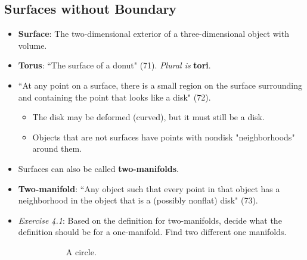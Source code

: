\documentclass[titlepage]{article}
\numberwithin{figure}{section}
\numberwithin{table}{section}
\numberwithin{equation}{section}
\newcommand{\dq}[2]{``#1" (#2).}
\begin{document}
\subsection{Surfaces without Boundary}
\begin{itemize}
    \item \textbf{Surface}: The two-dimensional exterior of a three-dimensional object with volume.
    \item \textbf{Torus}: \dq{The surface of a donut}{71} \emph{Plural is} \textbf{tori}.
    \item \dq{At any point on a surface, there is a small region on the surface surrounding and containing the point that looks like a disk}{72}
    \begin{itemize}
        \item The disk may be deformed (curved), but it must still be a disk.
        \item Objects that are not surfaces have points with nondisk "neighborhoods" around them.
    \end{itemize}
    \item Surfaces can also be called \textbf{two-manifolds}.
    \item \textbf{Two-manifold}: \dq{Any object such that every point in that object has a neighborhood in the object that is a (possibly nonflat) disk}{73}
    \item \emph{Exercise 4.1}: Based on the definition for two-manifolds, decide what the definition should be for a one-manifold. Find two different one manifolds.
    \begin{itemize}
        \begin{figure}[h!]
            \centering
            \begin{subfigure}[b]{0.2\linewidth}
                \centering
                \caption{A circle.}
                \label{fig:1manifoldsa}
            \end{subfigure}
            \begin{subfigure}[b]{0.2\linewidth}
                \centering

\end{subfigure}
\end{figure}
\end{itemize}
\end{itemize}
\end{document}
